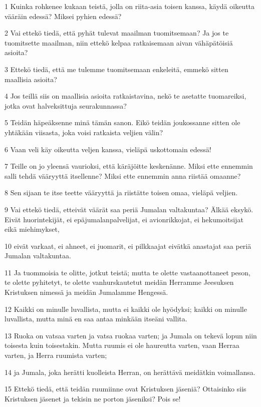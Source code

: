 \par 1 Kuinka rohkenee kukaan teistä, jolla on riita-asia toisen kanssa, käydä oikeutta vääräin edessä? Miksei pyhien edessä?
\par 2 Vai ettekö tiedä, että pyhät tulevat maailman tuomitsemaan? Ja jos te tuomitsette maailman, niin ettekö kelpaa ratkaisemaan aivan vähäpätöisiä asioita?
\par 3 Ettekö tiedä, että me tulemme tuomitsemaan enkeleitä, emmekö sitten maallisia asioita?
\par 4 Jos teillä siis on maallisia asioita ratkaistavina, nekö te asetatte tuomareiksi, jotka ovat halveksittuja seurakunnassa?
\par 5 Teidän häpeäksenne minä tämän sanon. Eikö teidän joukossanne sitten ole yhtäkään viisasta, joka voisi ratkaista veljien välin?
\par 6 Vaan veli käy oikeutta veljen kanssa, vieläpä uskottomain edessä!
\par 7 Teille on jo yleensä vaurioksi, että käräjöitte keskenänne. Miksi ette ennemmin salli tehdä vääryyttä itsellenne? Miksi ette ennemmin anna riistää omaanne?
\par 8 Sen sijaan te itse teette vääryyttä ja riistätte toisen omaa, vieläpä veljien.
\par 9 Vai ettekö tiedä, etteivät väärät saa periä Jumalan valtakuntaa? Älkää eksykö. Eivät huorintekijät, ei epäjumalanpalvelijat, ei avionrikkojat, ei hekumoitsijat eikä miehimykset,
\par 10 eivät varkaat, ei ahneet, ei juomarit, ei pilkkaajat eivätkä anastajat saa periä Jumalan valtakuntaa.
\par 11 Ja tuommoisia te olitte, jotkut teistä; mutta te olette vastaanottaneet peson, te olette pyhitetyt, te olette vanhurskautetut meidän Herramme Jeesuksen Kristuksen nimessä ja meidän Jumalamme Hengessä.
\par 12 Kaikki on minulle luvallista, mutta ei kaikki ole hyödyksi; kaikki on minulle luvallista, mutta minä en saa antaa minkään itseäni vallita.
\par 13 Ruoka on vatsaa varten ja vatsa ruokaa varten; ja Jumala on tekevä lopun niin toisesta kuin toisestakin. Mutta ruumis ei ole haureutta varten, vaan Herraa varten, ja Herra ruumista varten;
\par 14 ja Jumala, joka herätti kuolleista Herran, on herättävä meidätkin voimallansa.
\par 15 Ettekö tiedä, että teidän ruumiinne ovat Kristuksen jäseniä? Ottaisinko siis Kristuksen jäsenet ja tekisin ne porton jäseniksi? Pois se!
